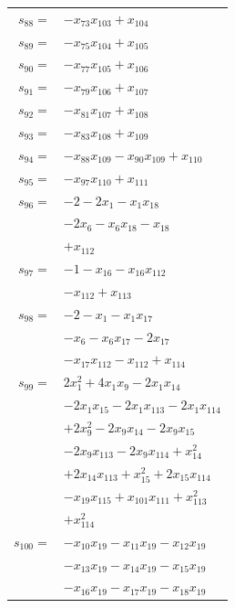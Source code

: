\begin{longtable}{@{}r@{\;}l@{}}
\(s_{88}=\) & \(\displaystyle -x_{73}x_{103} +x_{104}\) \\[3pt]
\(s_{89}=\) & \(\displaystyle -x_{75}x_{104} +x_{105}\) \\[3pt]
\(s_{90}=\) & \(\displaystyle -x_{77}x_{105} +x_{106}\) \\[3pt]
\(s_{91}=\) & \(\displaystyle -x_{79}x_{106} +x_{107}\) \\[3pt]
\(s_{92}=\) & \(\displaystyle -x_{81}x_{107} +x_{108}\) \\[3pt]
\(s_{93}=\) & \(\displaystyle -x_{83}x_{108} +x_{109}\) \\[3pt]
\(s_{94}=\) & \(\displaystyle -x_{88}x_{109} -x_{90}x_{109} +x_{110}\) \\[3pt]
\(s_{95}=\) & \(\displaystyle -x_{97}x_{110} +x_{111}\) \\[3pt]
\(s_{96}=\) & \(\displaystyle -2 -2x_{1} -x_{1}x_{18}\) \\
 & \(\displaystyle -2x_{6} -x_{6}x_{18} -x_{18}\) \\
 & \(\displaystyle +x_{112}\) \\[3pt]
\(s_{97}=\) & \(\displaystyle -1 -x_{16} -x_{16}x_{112}\) \\
 & \(\displaystyle -x_{112} +x_{113}\) \\[3pt]
\(s_{98}=\) & \(\displaystyle -2 -x_{1} -x_{1}x_{17}\) \\
 & \(\displaystyle -x_{6} -x_{6}x_{17} -2x_{17}\) \\
 & \(\displaystyle -x_{17}x_{112} -x_{112} +x_{114}\) \\[3pt]
\(s_{99}=\) & \(\displaystyle 2x_{1}^{2} +4x_{1}x_{9} -2x_{1}x_{14}\) \\
 & \(\displaystyle -2x_{1}x_{15} -2x_{1}x_{113} -2x_{1}x_{114}\) \\
 & \(\displaystyle +2x_{9}^{2} -2x_{9}x_{14} -2x_{9}x_{15}\) \\
 & \(\displaystyle -2x_{9}x_{113} -2x_{9}x_{114} +x_{14}^{2}\) \\
 & \(\displaystyle +2x_{14}x_{113} +x_{15}^{2} +2x_{15}x_{114}\) \\
 & \(\displaystyle -x_{19}x_{115} +x_{101}x_{111} +x_{113}^{2}\) \\
 & \(\displaystyle +x_{114}^{2}\) \\[3pt]
\(s_{100}=\) & \(\displaystyle -x_{10}x_{19} -x_{11}x_{19} -x_{12}x_{19}\) \\
 & \(\displaystyle -x_{13}x_{19} -x_{14}x_{19} -x_{15}x_{19}\) \\
 & \(\displaystyle -x_{16}x_{19} -x_{17}x_{19} -x_{18}x_{19}\) \\

\end{longtable}
